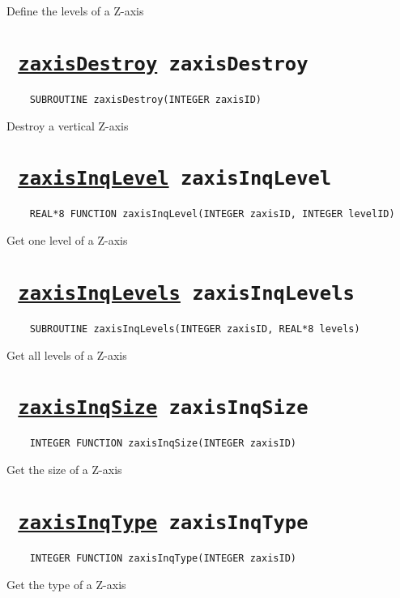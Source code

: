 Define the levels of a Z-axis
\ifpdfoutput{}{(\ref{zaxisDefLevels})}


\section*{\texttt{ 
\ifpdf
\hyperref[zaxisDestroy]{zaxisDestroy}
\else
zaxisDestroy
\fi
}}
\begin{verbatim}
    SUBROUTINE zaxisDestroy(INTEGER zaxisID)
\end{verbatim}

Destroy a vertical Z-axis
\ifpdfoutput{}{(\ref{zaxisDestroy})}


\section*{\texttt{ 
\ifpdf
\hyperref[zaxisInqLevel]{zaxisInqLevel}
\else
zaxisInqLevel
\fi
}}
\begin{verbatim}
    REAL*8 FUNCTION zaxisInqLevel(INTEGER zaxisID, INTEGER levelID)
\end{verbatim}

Get one level of a Z-axis
\ifpdfoutput{}{(\ref{zaxisInqLevel})}


\section*{\texttt{ 
\ifpdf
\hyperref[zaxisInqLevels]{zaxisInqLevels}
\else
zaxisInqLevels
\fi
}}
\begin{verbatim}
    SUBROUTINE zaxisInqLevels(INTEGER zaxisID, REAL*8 levels)
\end{verbatim}

Get all levels of a Z-axis
\ifpdfoutput{}{(\ref{zaxisInqLevels})}


\section*{\texttt{ 
\ifpdf
\hyperref[zaxisInqSize]{zaxisInqSize}
\else
zaxisInqSize
\fi
}}
\begin{verbatim}
    INTEGER FUNCTION zaxisInqSize(INTEGER zaxisID)
\end{verbatim}

Get the size of a Z-axis
\ifpdfoutput{}{(\ref{zaxisInqSize})}


\section*{\texttt{ 
\ifpdf
\hyperref[zaxisInqType]{zaxisInqType}
\else
zaxisInqType
\fi
}}
\begin{verbatim}
    INTEGER FUNCTION zaxisInqType(INTEGER zaxisID)
\end{verbatim}

Get the type of a Z-axis
\ifpdfoutput{}{(\ref{zaxisInqType})}
